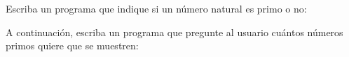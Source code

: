 Escriba un programa que indique
si un número natural es primo o no:

\begin{minipage}[t]{.20\textwidth}
  
\end{minipage}
\quad
\begin{minipage}[t]{.20\textwidth}
  
\end{minipage}
\quad
\begin{minipage}[t]{.20\textwidth}
  
\end{minipage}

A continuación, escriba un programa
que pregunte al usuario cuántos números primos
quiere que se muestren:

\begin{minipage}[t]{.70\textwidth}
  
\end{minipage}

